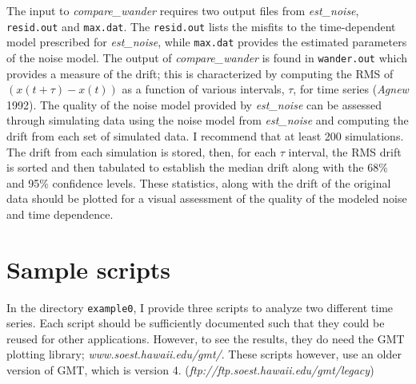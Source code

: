 \documentclass[12pt]{amsart}
\begin{document}
The input to  \textit{compare\_wander} requires two output files from \textit{est\_noise}, \texttt{resid.out} and \texttt{max.dat}.
The \texttt{resid.out} lists the misfits to the time-dependent model prescribed for \textit{est\_noise}, while \texttt{max.dat}
provides the estimated parameters of the noise model.  The output of \textit{compare\_wander} is found in \texttt{wander.out}
which provides a measure of the drift; this is characterized by computing the RMS of $(x(t+{\tau})-x(t))$ as a function of various
intervals, ${\tau}$, for  time series (\textit{Agnew} 1992). The quality of the noise model provided by \textit{est\_noise} can be assessed through
simulating data using the noise model from \textit{est\_noise} and computing the drift from each set of simulated data.
I recommend that at least 200 simulations.  The drift from each simulation is stored, then, for each ${\tau}$ interval,
the RMS drift is sorted and then tabulated to establish the median drift along with the 68\% and 95\% confidence levels.
These statistics, along with the drift of the original data should be plotted for a visual assessment of the quality of the
modeled noise and time dependence.


\section{Sample scripts}

In the directory \texttt{example0}, I provide three scripts to analyze two different time series. Each script should be
sufficiently documented such that they could be reused for other applications.  However, to see the results,
they do need the GMT plotting library; \textit{www.soest.hawaii.edu/gmt/}. These scripts however, use an older version
of GMT, which is version 4. (\textit{ftp://ftp.soest.hawaii.edu/gmt/legacy})
\end{document}

